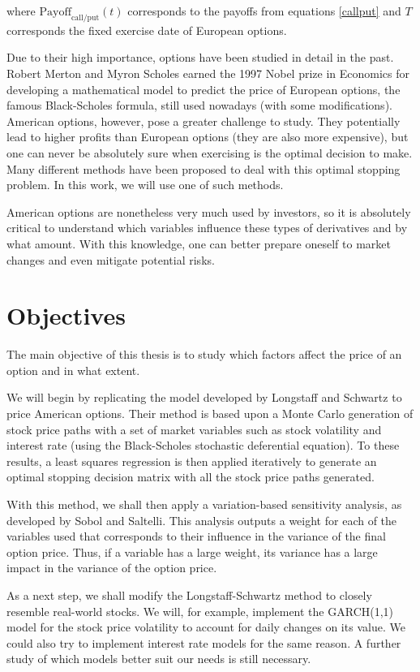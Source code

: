 \documentclass[a4paper,prd,twocolumn,nofootinbib,superscriptaddress,floatfix]{revtex4}
\begin{document}
\noindent where $\text{Payoff}_\text{call/put}(t)$ corresponds to the payoffs from equations \ref{callput} and $T$ corresponds the fixed exercise date of European options.

Due to their high importance, options have been studied in detail in the past.
Robert Merton and Myron Scholes earned the 1997 Nobel prize in Economics for developing a mathematical model to predict the price of European options, the famous Black-Scholes formula, still used nowadays (with some modifications).
American options, however, pose a greater challenge to study. They potentially lead to higher profits than European options (they are also more expensive), but one can never be absolutely sure when exercising is the optimal decision to make. Many different methods have been proposed to deal with this optimal stopping problem. In this work, we will use one of such methods.

American options are nonetheless very much used by investors, so it is absolutely critical to understand which variables influence these types of derivatives and by what amount. With this knowledge, one can better prepare oneself to market changes and even mitigate potential risks.

\section{Objectives}
The main objective of this thesis is to study which factors affect the price of an option and in what extent.

We will begin by replicating the model developed by Longstaff and Schwartz to price American options. Their method is based upon a Monte Carlo generation of stock price paths with a set of market variables such as stock volatility and interest rate (using the Black-Scholes stochastic deferential equation). To these results, a least squares regression is then applied iteratively to generate an optimal stopping decision matrix with all the stock price paths generated.

With this method, we shall then apply a variation-based sensitivity analysis, as developed by Sobol and Saltelli. This analysis outputs a weight for each of the variables used that corresponds to their influence in the variance of the final option price.
Thus, if a variable has a large weight, its variance has a large impact in the variance of the option price.

As a next step, we shall modify the Longstaff-Schwartz method to closely resemble real-world stocks. We will, for example, implement the GARCH(1,1) model for the stock price volatility to account for daily changes on its value. We could also try to implement interest rate models for the same reason.
A further study of which models better suit our needs is still necessary.
\end{document}
